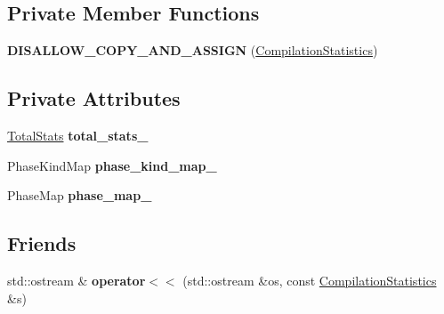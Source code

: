 \subsection*{Private Member Functions}
\begin{DoxyCompactItemize}
\item 
{\bfseries D\+I\+S\+A\+L\+L\+O\+W\+\_\+\+C\+O\+P\+Y\+\_\+\+A\+N\+D\+\_\+\+A\+S\+S\+I\+GN} (\hyperlink{classv8_1_1internal_1_1_compilation_statistics}{Compilation\+Statistics})\hypertarget{classv8_1_1internal_1_1_compilation_statistics_a64181dd5ed5f2b23edec383393669a27}{}\label{classv8_1_1internal_1_1_compilation_statistics_a64181dd5ed5f2b23edec383393669a27}

\end{DoxyCompactItemize}
\subsection*{Private Attributes}
\begin{DoxyCompactItemize}
\item 
\hyperlink{classv8_1_1internal_1_1_compilation_statistics_1_1_total_stats}{Total\+Stats} {\bfseries total\+\_\+stats\+\_\+}\hypertarget{classv8_1_1internal_1_1_compilation_statistics_aaa71bc738c317590cb5dff63a8298a93}{}\label{classv8_1_1internal_1_1_compilation_statistics_aaa71bc738c317590cb5dff63a8298a93}

\item 
Phase\+Kind\+Map {\bfseries phase\+\_\+kind\+\_\+map\+\_\+}\hypertarget{classv8_1_1internal_1_1_compilation_statistics_a581631e000a9f25db8c75831f134eb8d}{}\label{classv8_1_1internal_1_1_compilation_statistics_a581631e000a9f25db8c75831f134eb8d}

\item 
Phase\+Map {\bfseries phase\+\_\+map\+\_\+}\hypertarget{classv8_1_1internal_1_1_compilation_statistics_a6e488f5b1b211f4f693794dcf044a8ce}{}\label{classv8_1_1internal_1_1_compilation_statistics_a6e488f5b1b211f4f693794dcf044a8ce}

\end{DoxyCompactItemize}
\subsection*{Friends}
\begin{DoxyCompactItemize}
\item 
std\+::ostream \& {\bfseries operator$<$$<$} (std\+::ostream \&os, const \hyperlink{classv8_1_1internal_1_1_compilation_statistics}{Compilation\+Statistics} \&s)\hypertarget{classv8_1_1internal_1_1_compilation_statistics_aa63cb735a7bbee98812be50e59c28093}{}\label{classv8_1_1internal_1_1_compilation_statistics_aa63cb735a7bbee98812be50e59c28093}

\end{DoxyCompactItemize}
